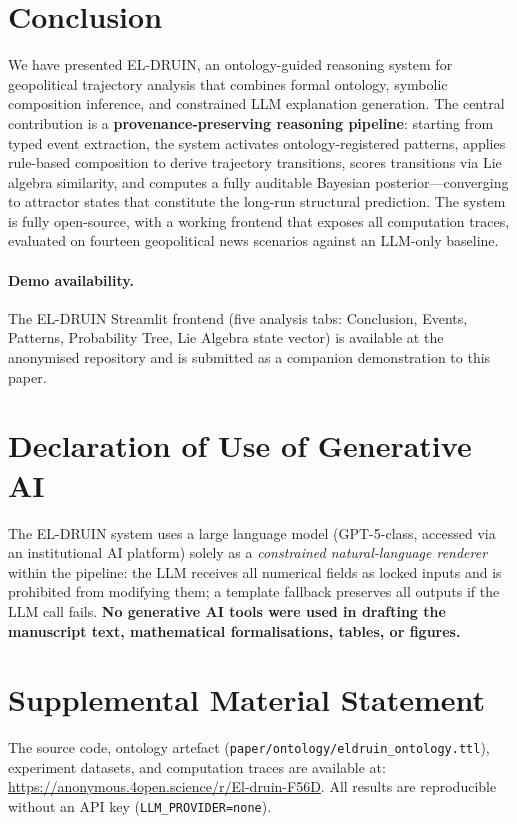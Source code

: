 \documentclass{llncs}
\begin{document}
\section{Conclusion}

We have presented EL-DRUIN, an ontology-guided reasoning system for
geopolitical trajectory analysis that combines formal ontology, symbolic
composition inference, and constrained LLM explanation generation. The
central contribution is a \textbf{provenance-preserving reasoning pipeline}:
starting from typed event extraction, the system activates ontology-registered
patterns, applies rule-based composition to derive trajectory transitions,
scores transitions via Lie algebra similarity, and computes a fully auditable
Bayesian posterior---converging to attractor states that constitute the
long-run structural prediction. The system is fully open-source, with a
working frontend that exposes all computation traces, evaluated on fourteen
geopolitical news scenarios against an LLM-only baseline.

\paragraph{Demo availability.}
The EL-DRUIN Streamlit frontend (five analysis tabs: Conclusion, Events, Patterns,
Probability Tree, Lie Algebra state vector) is available at the anonymised repository
and is submitted as a companion demonstration to this paper.

\section*{Declaration of Use of Generative AI}
The EL-DRUIN system uses a large language model (GPT-5-class, accessed via an
institutional AI platform) solely as a \emph{constrained natural-language renderer}
within the pipeline: the LLM receives all numerical fields as locked inputs and is
prohibited from modifying them; a template fallback preserves all outputs if the LLM
call fails. \textbf{No generative AI tools were used in drafting the manuscript text,
mathematical formalisations, tables, or figures.}

\section*{Supplemental Material Statement}
The source code, ontology artefact (\texttt{paper/ontology/eldruin\_ontology.ttl}), experiment datasets, and computation traces are available at: \url{https://anonymous.4open.science/r/El-druin-F56D}. All results are reproducible without an API key (\texttt{LLM\_PROVIDER=none}).
\end{document}
